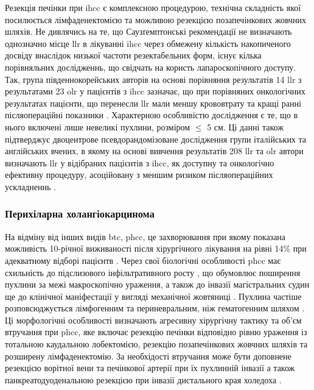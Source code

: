 \begin{refsection}
Резекція печінки при \acrshort{ihcc} є комплексною процедурою, технічна складність якої посилюється лімфаденектомією та можливою резекцією позапечінкових жовчних шляхів. Не дивлячись на те, що Саузґемптонські рекомендації не визначають однозначно місце \acrshort{llr} в лікуванні \acrshort{ihcc} через обмежену кількість накопиченого досвіду внаслідок низької частоти резектабельних форм, існує кілька порівняльних дослідженнь, що свідчать на користь лапароскопічного доступу. Так, група південнокорейських авторів на основі порівняння результатів 14 \acrshort{llr} з результатами 23 \acrshort{olr} у пацієнтів з \acrshort{ihcc} зазначає, що при порівняних онкологічних результатах пацієнти, що перенесли \acrshort{llr} мали меншу крововтрату та кращі ранні післяопераційні показники \cite{Lee2016a}. Характерною особливістю дослідження є те, що в нього включені лише невеликі пухлини, розміром $\leq$ 5 см. Ці данні також підтверджує двоцентрове псевдорандомізоване дослідження групи італійських та англійських вчених, в якому на основі вивчення результатів 208 \acrshort{llr} та \acrshort{olr} автори визначають \acrshort{llr} у відібраних пацієнтів  з \acrshort{ihcc}, як доступну та онкологічно ефективну процедуру, асоційовану з меншим ризиком післяопераційних ускладненнь \cite{Ratti2020}.


\subsubsection{Перихіларна холангіокарцинома}

На відміну від інших видів \acrshort{btc}, \acrshort{phcc}, це захворювання при якому показана можливість 10-річної виживаності після хірургічного лікування на рівні 14\% при адекватному відборі пацієнтв \cite{Juntermanns2019}. Через свої біологічні особливості \acrshort{phcc} має схильність до підслизового інфільтративного росту \cite{Sakamoto1998}, що обумовлює поширення пухлини за межі макроскопічно ураження, а також до інвазії магістральних судин ще до клінічної маніфестації у вигляді механічної жовтяниці \cite{Shimada2003}. Пухлина частіше розповсюджується лімфогенним та периневральним, ніж гематогенним шляхом \cite{Zimmermann2017}. Ці морфологічні особливості визначають агресивну хірургічну тактику та об'єм  втручання при \acrshort{phcc}, яке включає резекцію печінки відповідно рівню ураження із тотальною каудальною лобектомією, резекцію позапечінкових жовчних шляхів та розширену лімфаденектомію. За необхідості втручання може бути доповнене резекцією ворітної вени та печінкової артерії при їх пухлинній інвазії а також панкреатодуоденальною резекцією при інвазії дистального края холедоха \cite{Mizuno2019}. 


\end{refsection}
